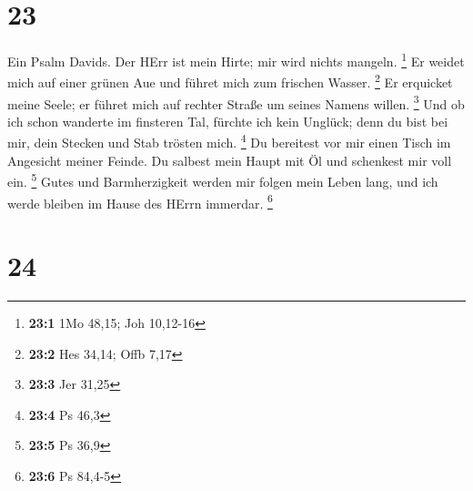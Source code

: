 \hypertarget{section-9}{%
\section{23}\label{section-9}}

 Ein Psalm Davids. Der HErr ist mein Hirte; mir wird nichts
mangeln. \footnote{\textbf{23:1} 1Mo 48,15; Joh 10,12-16} 
Er weidet mich auf einer grünen Aue und führet mich zum frischen Wasser.
\footnote{\textbf{23:2} Hes 34,14; Offb 7,17}  Er erquicket
meine Seele; er führet mich auf rechter Straße um seines Namens willen.
\footnote{\textbf{23:3} Jer 31,25}  Und ob ich schon
wanderte im finsteren Tal, fürchte ich kein Unglück; denn du bist bei
mir, dein Stecken und Stab trösten mich. \footnote{\textbf{23:4} Ps 46,3}
 Du bereitest vor mir einen Tisch im Angesicht meiner
Feinde. Du salbest mein Haupt mit Öl und schenkest mir voll ein.
\footnote{\textbf{23:5} Ps 36,9}  Gutes und Barmherzigkeit
werden mir folgen mein Leben lang, und ich werde bleiben im Hause des
HErrn immerdar. \footnote{\textbf{23:6} Ps 84,4-5}

\hypertarget{section-10}{%
\section{24}\label{section-10}}

